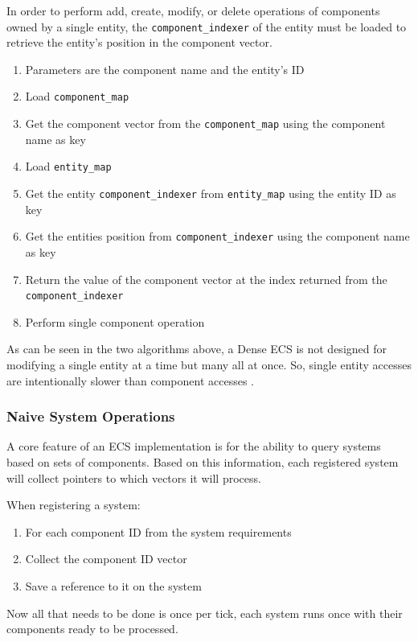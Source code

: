 In order to perform add, create, modify, or delete operations of components owned by a single entity, the \texttt{component\_indexer} of the entity must be loaded to retrieve the entity's position in the component vector.

\begin{enumerate}
    \item Parameters are the component name and the entity's ID
    \item Load \texttt{component\_map}
    \item Get the component vector from the \texttt{component\_map} using the component name as key
    \item Load \texttt{entity\_map}
    \item Get the entity \texttt{component\_indexer} from \texttt{entity\_map} using the entity ID as key
    \item Get the entities position from \texttt{component\_indexer} using the component name as key
    \item Return the value of the component vector at the index returned from the \texttt{component\_indexer}
    \item Perform single component operation
\end{enumerate}

As can be seen in the two algorithms above, a Dense ECS is not designed for modifying a single entity at a time but many all at once. So, single entity accesses are intentionally slower than component accesses \cite{EnTT_SparseSets}.

\subsubsection{Naive System Operations}
A core feature of an ECS implementation is for the ability to query systems based on sets of components. Based on this information, each registered system will collect pointers to which vectors it will process.

When registering a system:
\begin{enumerate}
    \item For each component ID from the system requirements
    \item Collect the component ID vector
    \item Save a reference to it on the system
\end{enumerate}

Now all that needs to be done is once per tick, each system runs once with their components ready to be processed.

